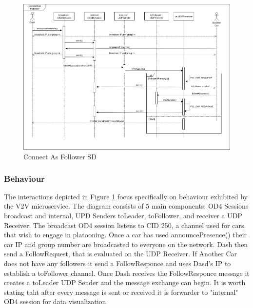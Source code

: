 \documentclass[12pt]{article}
\begin{document}
\FloatBarrier %
\begin{figure}[ht!]
\centering
\includegraphics[width=\linewidth]{Diagrams/ConnectAsFollower.png}
\caption{Connect As Follower SD}
\label{fig:connectasfollower}
\end{figure}
\FloatBarrier %

\subsubsection{Behaviour} \label{subsubsec: follower bahaviour}
The interactions depicted in Figure \ref{fig:connectasfollower} focus specifically on behaviour exhibited by the V2V microservice. The diagram consists of 5 main components; OD4 Sessions broadcast and internal, UPD Senders toLeader, toFollower, and receiver a UDP Receiver. The broadcast OD4 session listens to CID 250, a channel used for cars that wish to engage in platooning. Once a car has used announcePresence() their car IP and group number are broadcasted to everyone on the network. Dash then send a FollowRequest, that is evaluated on the UDP Receiver. If Another Car does not have any followers it send a FollowResponce and uses Dasd's IP to establish a toFollower channel. Once Dash receives the FollowResponce message it creates a toLeader UDP Sender and the message exchange can begin. It is worth stating taht after every message is sent or received it is forwarder to "internal" OD4 session for data visualization.\par
\end{document}
